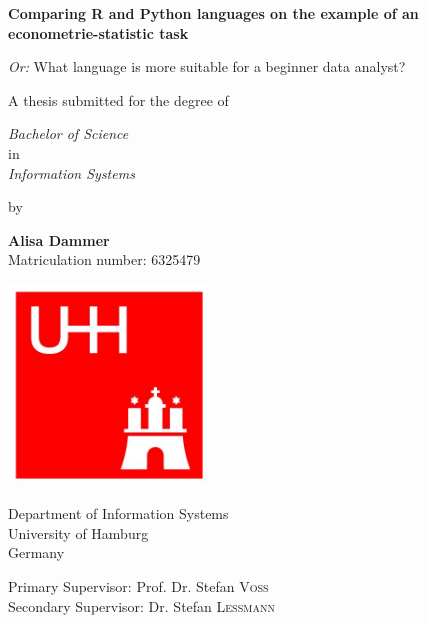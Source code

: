 \documentclass[
  twoside,
  11pt, a4paper,
  footinclude=true,
  headinclude=true,
  cleardoublepage=empty
]{scrreprt}
\begin{document}
    
    \begin{titlepage}
        \begin{center}
            \LARGE
            \textbf{Comparing R and Python languages on the example of an econometrie-statistic task }
            
            \vspace{0.5cm}
    
            \Large
            \textit{Or:} What language is more suitable for a beginner data analyst?
    
            \vspace{0.5cm}
            
            A thesis submitted for the degree of
    
            \vspace{0.5cm}
    
            \emph{Bachelor of Science}\\
            in\\
            \emph{Information Systems}
            
            \vspace{0.6cm}
    
            by
    
            \vspace{0.3cm}
            
            \textbf{Alisa Dammer}\\
            {\small Matriculation number: 6325479}
            
            \vspace{0.5cm}
            
            \includegraphics[width=0.4\textwidth]{logo_uhh.jpg}
            
        
            \Large
            Department of Information Systems\\
            University of Hamburg\\
            Germany\\
    
            \vspace{0.3cm}
    
            \large
            Primary Supervisor: Prof. Dr. Stefan \textsc{Voß}\\
            Secondary Supervisor: Dr. Stefan \textsc{Lessmann}
            
        \end{center}
    \end{titlepage}
\end{document}
